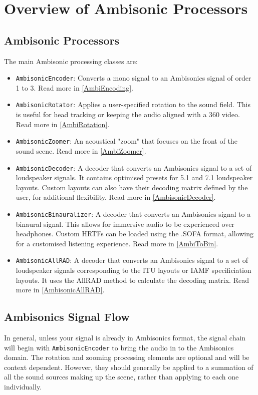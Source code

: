 \documentclass[12pt]{report}
\newcommand{\code}[1]{\texttt{#1}}
\begin{document}
\section{Overview of Ambisonic Processors}\label{AmbisonicOverview}

\subsection{Ambisonic Processors}

The main Ambisonic processing classes are:
\begin{itemize}
\item \code{AmbisonicEncoder}: Converts a mono signal to an Ambisonics signal of order 1 to 3. Read more in \cref{AmbiEncoding}.
\item \code{AmbisonicRotator}: Applies a user-specified rotation to the sound field. This is useful for head tracking or keeping the audio aligned with a 360 video. Read more in \cref{AmbiRotation}.
\item \code{AmbisonicZoomer}: An acoustical "zoom" that focuses on the front of the sound scene. Read more in \cref{AmbiZoomer}.
\item \code{AmbisonicDecoder}: A decoder that converts an Ambisonics signal to a set of loudspeaker signals. It contains optimised presets for 5.1 and 7.1 loudspeaker layouts. Custom layouts can also have their decoding matrix defined by the user, for additional flexibility. Read more in \cref{AmbisonicDecoder}.
\item \code{AmbisonicBinauralizer}: A decoder that converts an Ambisonics signal to a binaural signal. This allows for immersive audio to be experienced over headphones. Custom HRTFs can be loaded using the .SOFA format, allowing for a customised listening experience. Read more in \cref{AmbiToBin}.
\item \code{AmbisonicAllRAD}: A decoder that converts an Ambisonics signal to a set of loudspeaker signals corresponding to the ITU layouts or IAMF specificiation layouts. It uses the AllRAD method to calculate the decoding matrix. Read more in \cref{AmbisonicAllRAD}.
\end{itemize}

\subsection{Ambisonics Signal Flow}

In general, unless your signal is already in Ambisonics format, the signal chain will begin with \code{AmbisonicEncoder} to bring the audio in to the Ambisonics domain.
The rotation and zooming processing elements are optional and will be context dependent. However, they should generally be applied to a summation of all the sound sources making up the scene, rather than applying to each one individually.
\end{document}
